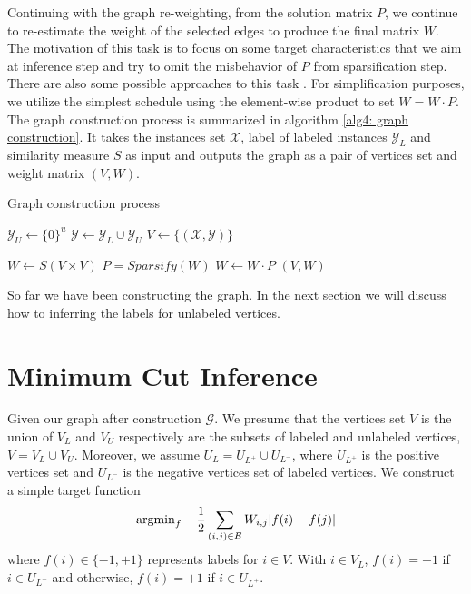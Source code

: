 Continuing with the graph re-weighting, from the solution matrix $P$, we continue to re-estimate the weight of the selected edges to produce the final matrix $W$. The motivation of this task is to focus on some target characteristics that we aim at inference step and try to omit the misbehavior of $P$ from sparsification step. There are also some possible approaches to this task \parencite{Jebara:2009:GCB:1553374.1553432, Subramanya:2014:GSL:2765801}. For simplification purposes, we utilize the simplest schedule using the element-wise product to set $W = W \cdot P$. The graph construction process is summarized in algorithm \ref{alg4: graph construction}. It takes the instances set $\mathcal{X}$, label of labeled instances $\mathcal{Y}_L$ and similarity measure $S$ as input and outputs the graph as a pair of vertices set and weight matrix $(V, W)$.
\begin{algorithm}[H]
	\caption{Graph construction process}
	\begin{algorithmic}[1]
		
		\State $\mathcal{Y}_U \gets \{0\}^u$
		\State $\mathcal{Y} \gets \mathcal{Y}_L \cup \mathcal{Y}_U$
		\State $V \gets \{(\mathcal{X}, \mathcal{Y})\}$
		
		\State $W \gets S(V \times V)$
		\State $P = Sparsify(W)$
		\State $W \gets W \cdot P$
		\RETURN $(V, W)$
		
		\EndFunction
	\end{algorithmic}
	\label{alg4: graph construction}
\end{algorithm}

So far we have been constructing the graph. In the next section we will discuss how to inferring the labels for unlabeled vertices.

\section{Minimum Cut Inference}
\label{section3: mincut approach}

Given our graph after construction $\mathcal{G}$. We presume that the vertices set $V$ is the union of $V_L$ and $V_U$ respectively are the subsets of labeled and unlabeled vertices,  $V = V_L \cup V_U$. Moreover, we assume $U_L = U_{L^+} \cup U_{L^-}$, where $U_{L^+}$ is the positive vertices set and $U_{L^-}$ is the negative vertices set of labeled vertices. We construct a simple target function
\begin{align}
\label{equal4: target function}
\operatorname{argmin}_{f} \quad \frac{1}{2}\sum_{(i,j) \in E}{W_{i,j}|f(i) - f(j)|}
\end{align}
where $f(i) \in \{-1, +1\}$ represents labels for $i \in V$. With $i \in V_L$, $f(i) = -1$ if $i \in U_{L^-}$ and otherwise, $f(i) = +1$ if $i \in U_{L^+}$.

